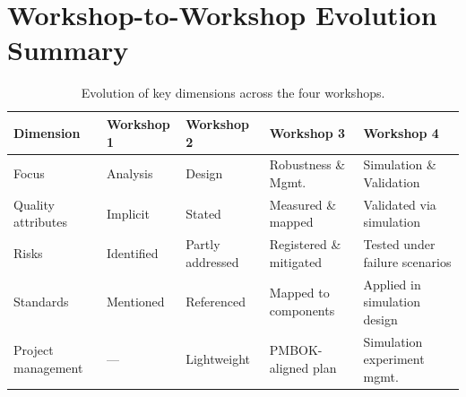 \documentclass[11pt,a4paper]{article}
\begin{document}
\section{Workshop-to-Workshop Evolution Summary}

\begin{table}[H]
\centering
\caption{Evolution of key dimensions across the four workshops.}
\label{tab:evolution}
\small
\begin{tabularx}{\textwidth}{l X X X X}
\toprule
\textbf{Dimension} & \textbf{Workshop 1} & \textbf{Workshop 2} & \textbf{Workshop 3} & \textbf{Workshop 4} \\
\midrule
Focus & Analysis & Design & Robustness \& Mgmt. & Simulation \& Validation \\
Quality attributes & Implicit & Stated & Measured \& mapped & Validated via simulation \\
Risks & Identified & Partly addressed & Registered \& mitigated & Tested under failure scenarios \\
Standards & Mentioned & Referenced & Mapped to components & Applied in simulation design \\
Project management & --- & Lightweight & PMBOK-aligned plan & Simulation experiment mgmt. \\
\bottomrule
\end{tabularx}
\end{table}
\end{document}
